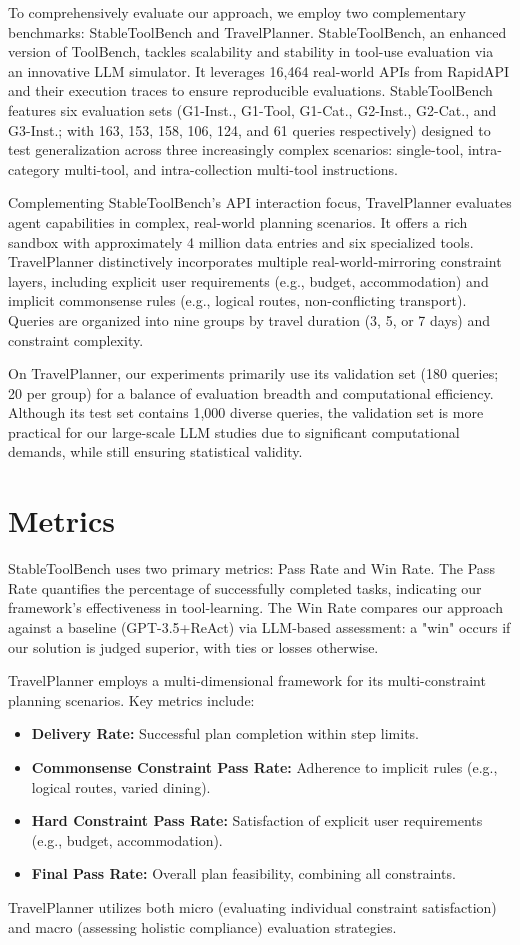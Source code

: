 \documentclass{article}
\begin{document}
To comprehensively evaluate our approach, we employ two complementary benchmarks: StableToolBench and TravelPlanner. StableToolBench, an enhanced version of ToolBench, tackles scalability and stability in tool-use evaluation via an innovative LLM simulator. It leverages 16,464 real-world APIs from RapidAPI and their execution traces to ensure reproducible evaluations. StableToolBench features six evaluation sets (G1-Inst., G1-Tool, G1-Cat., G2-Inst., G2-Cat., and G3-Inst.; with 163, 153, 158, 106, 124, and 61 queries respectively) designed to test generalization across three increasingly complex scenarios: single-tool, intra-category multi-tool, and intra-collection multi-tool instructions.


Complementing StableToolBench's API interaction focus, TravelPlanner evaluates agent capabilities in complex, real-world planning scenarios. It offers a rich sandbox with approximately 4 million data entries and six specialized tools. TravelPlanner distinctively incorporates multiple real-world-mirroring constraint layers, including explicit user requirements (e.g., budget, accommodation) and implicit commonsense rules (e.g., logical routes, non-conflicting transport). Queries are organized into nine groups by travel duration (3, 5, or 7 days) and constraint complexity.


On TravelPlanner, our experiments primarily use its validation set (180 queries; 20 per group) for a balance of evaluation breadth and computational efficiency. Although its test set contains 1,000 diverse queries, the validation set is more practical for our large-scale LLM studies due to significant computational demands, while still ensuring statistical validity.



\section{Metrics}
StableToolBench uses two primary metrics: Pass Rate and Win Rate. The Pass Rate quantifies the percentage of successfully completed tasks, indicating our framework's effectiveness in tool-learning. The Win Rate compares our approach against a baseline (GPT-3.5+ReAct) via LLM-based assessment: a "win" occurs if our solution is judged superior, with ties or losses otherwise.

TravelPlanner employs a multi-dimensional framework for its multi-constraint planning scenarios. Key metrics include:
\begin{itemize}
    \item \textbf{Delivery Rate:} Successful plan completion within step limits.
    \item \textbf{Commonsense Constraint Pass Rate:} Adherence to implicit rules (e.g., logical routes, varied dining).
    \item \textbf{Hard Constraint Pass Rate:} Satisfaction of explicit user requirements (e.g., budget, accommodation).
    \item \textbf{Final Pass Rate:} Overall plan feasibility, combining all constraints.
\end{itemize}
TravelPlanner utilizes both micro (evaluating individual constraint satisfaction) and macro (assessing holistic compliance) evaluation strategies.
\end{document}
